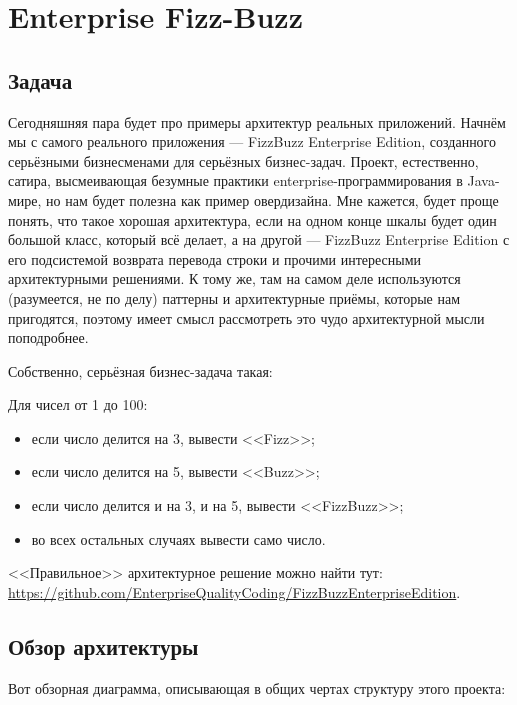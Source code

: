\documentclass{../../text-style}
\begin{document}
\maketitle
\thispagestyle{empty}

\section{Enterprise Fizz-Buzz}

\subsection{Задача}

Сегодняшняя пара будет про примеры архитектур реальных приложений. Начнём мы с самого реального приложения --- FizzBuzz Enterprise Edition, созданного серьёзными бизнесменами для серьёзных бизнес-задач. Проект, естественно, сатира, высмеивающая безумные практики enterprise-программирования в Java-мире, но нам будет полезна как пример овердизайна. Мне кажется, будет проще понять, что такое хорошая архитектура, если на одном конце шкалы будет один большой класс, который всё делает, а на другой --- FizzBuzz Enterprise Edition с его подсистемой возврата перевода строки и прочими интересными архитектурными решениями. К тому же, там на самом деле используются (разумеется, не по делу) паттерны и архитектурные приёмы, которые нам пригодятся, поэтому имеет смысл рассмотреть это чудо архитектурной мысли поподробнее.

Собственно, серьёзная бизнес-задача такая:

Для чисел от 1 до 100:
\begin{itemize}
    \item если число делится на 3, вывести <<Fizz>>;
    \item если число делится на 5, вывести <<Buzz>>;
    \item если число делится и на 3, и на 5, вывести <<FizzBuzz>>;
    \item во всех остальных случаях вывести само число.
\end{itemize}

<<Правильное>> архитектурное решение можно найти тут: \url{https://github.com/EnterpriseQualityCoding/FizzBuzzEnterpriseEdition}.

\subsection{Обзор архитектуры}

Вот обзорная диаграмма, описывающая в общих чертах структуру этого проекта:
\end{document}
